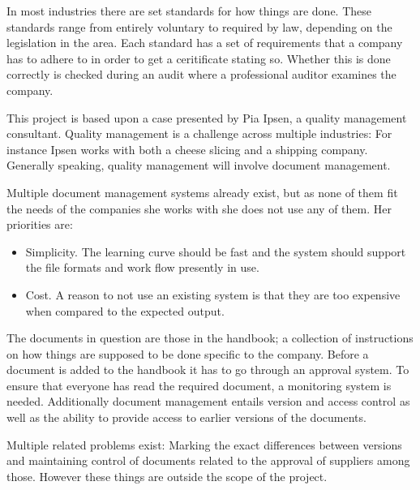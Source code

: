 In most industries there are set standards for how things are done.
These standards range from  entirely voluntary to required by law, depending on the legislation in the area.
Each standard has a set of requirements that a company has to adhere to in order to get a ceritificate stating so.
Whether this is done correctly is checked during an audit where a professional auditor examines the company.

This project is based upon a case presented by Pia Ipsen, a quality management consultant.
Quality management is a challenge across multiple industries: For instance Ipsen works with both a cheese slicing and a shipping company.
Generally speaking, quality management will involve document management.

Multiple document management systems already exist, but as none of them fit the needs of the companies she works with she does not use any of them.
Her priorities are:

\begin{itemize}
\item Simplicity. The learning curve should be fast and the system should support the file formats and work flow presently in use.
\item Cost. A reason to not use an existing system is that they are too expensive when compared to the expected output.
\end{itemize}

The documents in question are those in the handbook; a collection of instructions on how things are supposed to be done specific to the company.
Before a document is added to the handbook it has to go through an approval system.
To ensure that everyone has read the required document, a monitoring system is needed.
Additionally document management entails version and access control as well as the ability to provide access to earlier versions of the documents.

Multiple related problems exist: Marking the exact differences between versions and maintaining control of documents related to the approval of suppliers among those.
However these things are outside the scope of the project.


